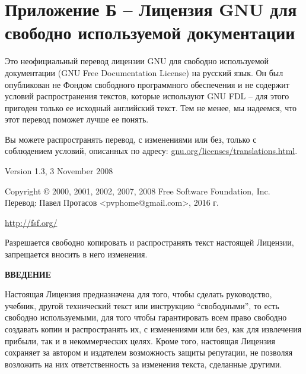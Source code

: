 \chapter{Приложение Б -- Лицензия GNU для свободно используемой
  документации}
\label{Appendix B}


 \begin{center}
  Это неофициальный перевод лицензии GNU для свободно используемой
  документации (GNU Free Documentation License) на русский язык. Он
  был опубликован не Фондом свободного программного обеспечения и не
  содержит условий распространения текстов, которые используют GNU FDL
  -- для этого пригоден только ее исходный английский текст. Тем не
  менее, мы надеемся, что этот перевод поможет лучше ее понять.

  Вы можете распространять перевод, с изменениями или без, только с
  соблюдением условий, описанных по адресу:
  \href{http://www.gnu.org/licenses/translations.html}{gnu.org/licenses/translations.html}.
 \end{center}

 \begin{center}

       Version 1.3, 3 November 2008


 Copyright \copyright{} 2000, 2001, 2002, 2007, 2008  Free Software
 Foundation, Inc. Перевод: Павел Протасов <pvphome@gmail.com>, 2016 г.

 \bigskip

     \url{http://fsf.org/}

 \bigskip

 Разрешается свободно копировать и распространять текст настоящей
 Лицензии, запрещается вносить в него изменения.
\end{center}


\begin{center}
{\bf\large ВВЕДЕНИЕ}
\end{center}

Настоящая Лицензия предназначена для того, чтобы сделать руководство,
учебник, другой технический текст или инструкцию \enquote{свободными},
то есть свободно используемыми, для того чтобы гарантировать всем
право свободно создавать копии и распространять их, с изменениями или
без, как для извлечения прибыли, так и в некоммерческих целях. Кроме
того, настоящая Лицензия сохраняет за автором и издателем возможность
защиты репутации, не позволяя возложить на них ответственность за
изменения текста, сделанные другими.

